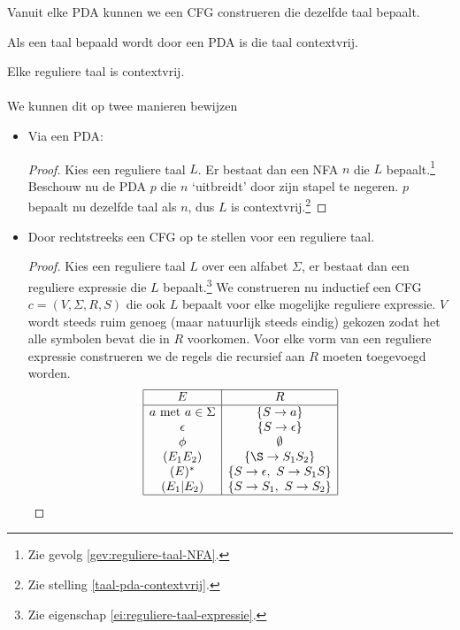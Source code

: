 \documentclass[main.tex]{subfiles}
\begin{document}
\begin{lem}
  \label{lem:pda-naar-cfg}
 Vanuit elke PDA kunnen we een CFG construeren die dezelfde taal bepaalt. 
\end{lem}

\begin{gev}
  \label{taal-pda-contextvrij}
  Als een taal bepaald wordt door een PDA is die taal contextvrij.
\end{gev}

\begin{gev}
  Elke reguliere taal is contextvrij.\\\\
  We kunnen dit op twee manieren bewijzen
  \begin{itemize}
  \item Via een PDA:
    \begin{proof}
      Kies een reguliere taal $L$. Er bestaat dan een NFA $n$ die $L$ bepaalt.\footnote{Zie gevolg \ref{gev:reguliere-taal-NFA}.}
      Beschouw nu de PDA $p$ die $n$ `uitbreidt' door zijn stapel te negeren.
      $p$ bepaalt nu dezelfde taal als $n$, dus $L$ is contextvrij.\footnote{Zie stelling \ref{taal-pda-contextvrij}.}
    \end{proof}
  \item Door rechtstreeks een CFG op te stellen voor een reguliere taal.
    \begin{proof}
      Kies een reguliere taal $L$ over een alfabet $\Sigma$, er bestaat dan een reguliere expressie die $L$ bepaalt.\footnote{Zie eigenschap \ref{ei:reguliere-taal-expressie}.}
      We construeren nu inductief een CFG $c = (V,\Sigma,R,S)$ die ook $L$ bepaalt voor elke mogelijke reguliere expressie.
      $V$ wordt steeds ruim genoeg (maar natuurlijk steeds eindig) gekozen zodat het alle symbolen bevat die in $R$ voorkomen.
      Voor elke vorm van een reguliere expressie construeren we de regels die recursief aan $R$ moeten toegevoegd worden.
      \[
      \begin{array}{|c|c|}
        \hline
        E                           & R\\
        \hline
        a \text{ met } a \in \Sigma & \{ S \rightarrow a \}\\
        \epsilon                    & \{ S \rightarrow \epsilon \} \\
        \phi                        & \emptyset\\
        (E_1E_2)                    & \{ \S \rightarrow S_{1}S_{2} \} \\
        (E)^{*}                      & \{ S \rightarrow \epsilon,\ S \rightarrow S_{1}S \}\\
        (E_1|E_2)                   & \{ S \rightarrow S_{1},\ S \rightarrow S_{2} \}\\
        \hline
      \end{array}
      \]
    \end{proof}
  \end{itemize}
\end{gev}
\end{document}

